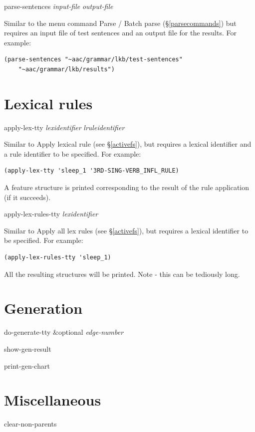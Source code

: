 \documentclass[12pt]{report}
\newcommand{\lispcommand}[1]{\noindent\rm #1}%
\newcommand{\lkbmenucommand}{{\bf}}
\begin{document}
\lispcommand{parse-sentences {\it input-file} {\it output-file}}

Similar to the menu command {\lkbmenucommand Parse} / {\lkbmenucommand Batch parse}
 (\S\ref{parsecommands}) but requires an input file of test sentences
and an output file for the results.  For example:
\begin{verbatim}
(parse-sentences "~aac/grammar/lkb/test-sentences" 
    "~aac/grammar/lkb/results")
\end{verbatim}

\section{Lexical rules}
\lispcommand{apply-lex-tty {\it lexidentifier} {\it lruleidentifier}}

Similar to {\lkbmenucommand Apply lexical rule} (see \S\ref{activefs}),
but requires a lexical identifier and a rule identifier to be specified.
For example:
\begin{verbatim}
(apply-lex-tty 'sleep_1 '3RD-SING-VERB_INFL_RULE)
\end{verbatim}
A feature structure is printed corresponding to the result 
of the rule application (if it succeeds).

\lispcommand{apply-lex-rules-tty {\it lexidentifier} }

Similar to {\lkbmenucommand Apply all lex rules} (see \S\ref{activefs}),
but requires a lexical identifier to be specified.
For example:
\begin{verbatim}
(apply-lex-rules-tty 'sleep_1)
\end{verbatim}
All the resulting structures will be printed.  Note - this can be
tediously long.

\section{Generation}

\lispcommand{do-generate-tty \&optional {\it edge-number}}

\lispcommand{show-gen-result}

\lispcommand{print-gen-chart}

\section{Miscellaneous}

\lispcommand{clear-non-parents}
\end{document}
